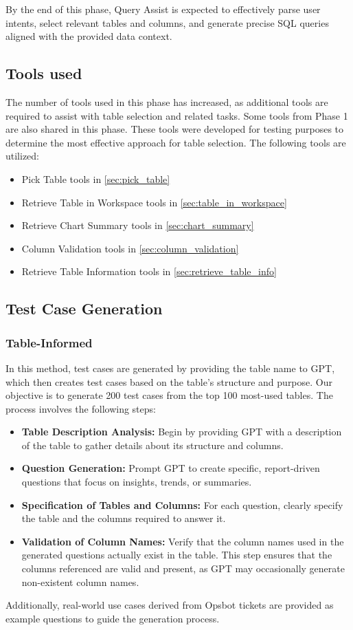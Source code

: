     By the end of this phase, Query Assist is expected to effectively parse user intents, select relevant tables and columns, and generate precise SQL queries aligned with the provided data context.
    \subsection{Tools used}
    The number of tools used in this phase has increased, as additional tools are required to assist with table selection and related tasks. Some tools from Phase 1 are also shared in this phase. These tools were developed for testing purposes to determine the most effective approach for table selection.
    The following tools are utilized: 

    \begin{itemize}
        \item Pick Table tools in \ref{sec:pick_table}
        \item Retrieve Table in Workspace tools in \ref{sec:table_in_workspace}
        \item Retrieve Chart Summary tools in \ref{sec:chart_summary}
        \item Column Validation tools in \ref{sec:column_validation}
        \item Retrieve Table Information tools in \ref{sec:retrieve_table_info}
    \end{itemize}
    \subsection{Test Case Generation}
        \subsubsection{Table-Informed}
        In this method, test cases are generated by providing the table name to GPT, which then creates test cases based on the table's structure and purpose. Our objective is to generate 200 test cases from the top 100 most-used tables. The process involves the following steps:
        \begin{itemize}
            \item \textbf{Table Description Analysis:} Begin by providing GPT with a description of the table to gather details about its structure and columns.
            \item \textbf{Question Generation:} Prompt GPT to create specific, report-driven questions that focus on insights, trends, or summaries.
            \item \textbf{Specification of Tables and Columns:} For each question, clearly specify the table and the columns required to answer it.
            \item \textbf{Validation of Column Names:} Verify that the column names used in the generated questions actually exist in the table. This step ensures that the columns referenced are valid and present, as GPT may occasionally generate non-existent column names.
        \end{itemize}
        Additionally, real-world use cases derived from Opsbot tickets are provided as example questions to guide the generation process.

